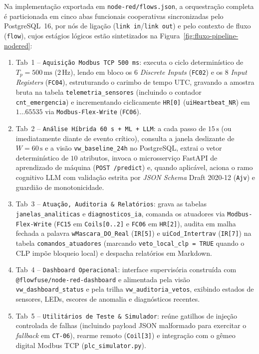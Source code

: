 Na implementação exportada em \texttt{node-red/\allowbreak flows.json}, a orquestração completa é particionada em cinco abas funcionais cooperativas sincronizadas pelo PostgreSQL~16, por nós de ligação (\texttt{link in}/\texttt{link out}) e pelo contexto de fluxo (\texttt{flow}), cujos estágios lógicos estão sintetizados na Figura~\ref{fig:fluxo-pipeline-nodered}:
\begin{enumerate}
  \item Tab~1 -- \texttt{Aquisição Modbus TCP 500 ms}: executa o ciclo determinístico de $T_p = 500\,\text{ms}$ ($2\,\text{Hz}$), lendo em bloco os 6 \textit{Discrete Inputs} (\texttt{FC02}) e os 8 \textit{Input Registers} (\texttt{FC04}), estruturando o carimbo de tempo UTC, gravando a amostra bruta na tabela \texttt{telemetria\_\allowbreak sensores} (incluindo o contador \texttt{cnt\_\allowbreak emergencia}) e incrementando ciclicamente \texttt{HR[0]} (\texttt{uiHeartbeat\_NR}) em $1\dots 65535$ via \texttt{Modbus-\allowbreak Flex-\allowbreak Write} (\texttt{FC06}).
  \item Tab~2 -- \texttt{Análise Híbrida 60 s + ML + LLM}: a cada passo de $15\,\text{s}$ (ou imediatamente diante de evento crítico), consulta a janela deslizante de $W = 60\,\text{s}$ e a visão \texttt{vw\_\allowbreak baseline\_\allowbreak 24h} no PostgreSQL, extrai o vetor determinístico de $10$ atributos, invoca o microsserviço FastAPI de aprendizado de máquina (\texttt{POST /predict}) e, quando aplicável, aciona o ramo cognitivo LLM com validação estrita por \textit{JSON Schema} Draft 2020-12 (\texttt{Ajv}) e guardião de monotonicidade.
  \item Tab~3 -- \texttt{Atuação, Auditoria \& Relatórios}: grava as tabelas \texttt{janelas\_\allowbreak analiticas} e \texttt{diagnosticos\_\allowbreak ia}, comanda os atuadores via \texttt{Modbus-\allowbreak Flex-\allowbreak Write} (\texttt{FC15} em \texttt{Coils[0..2]} e \texttt{FC06} em \texttt{HR[2]}), audita em malha fechada a palavra \texttt{wMascara\_\allowbreak DO\_\allowbreak Real} (\texttt{IR[5]}) e \texttt{uiCod\_\allowbreak Intertrav} (\texttt{IR[7]}) na tabela \texttt{comandos\_\allowbreak atuadores} (marcando \texttt{veto\_\allowbreak local\_\allowbreak clp = TRUE} quando o CLP impõe bloqueio local) e despacha relatórios em Markdown.
  \item Tab~4 -- \texttt{Dashboard Operacional}: interface supervisória construída com \texttt{@flowfuse/\allowbreak node-red-\allowbreak dashboard} e alimentada pela visão \texttt{vw\_\allowbreak dashboard\_\allowbreak status} e pela trilha \texttt{vw\_\allowbreak auditoria\_\allowbreak vetos}, exibindo estados de sensores, LEDs, escores de anomalia e diagnósticos recentes.
  \item Tab~5 -- \texttt{Utilitários de Teste \& Simulador}: reúne gatilhos de injeção controlada de falhas (incluindo payload JSON malformado para exercitar o \textit{fallback} em \texttt{CT-06}), rearme remoto (\texttt{Coil[3]}) e integração com o gêmeo digital Modbus TCP (\texttt{plc\_\allowbreak simulator.py}).
\end{enumerate}


